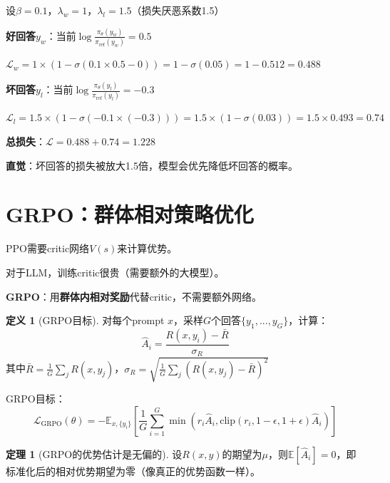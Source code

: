 \documentclass[11pt,a4paper]{article}
\theoremstyle{definition}
\newtheorem{definition}{定义}[section]
\newtheorem{theorem}{定理}[section]
\begin{document}
\begin{calculation}[KTO的数值例子]
设$\beta = 0.1$，$\lambda_w = 1$，$\lambda_l = 1.5$（损失厌恶系数1.5）

\textbf{好回答}$y_w$：当前$\log \frac{\pi_\theta(y_w)}{\pi_{\text{ref}}(y_w)} = 0.5$

$\mathcal{L}_w = 1 \times (1 - \sigma(0.1 \times 0.5 - 0)) = 1 - \sigma(0.05) = 1 - 0.512 = 0.488$

\textbf{坏回答}$y_l$：当前$\log \frac{\pi_\theta(y_l)}{\pi_{\text{ref}}(y_l)} = -0.3$

$\mathcal{L}_l = 1.5 \times (1 - \sigma(-0.1 \times (-0.3))) = 1.5 \times (1 - \sigma(0.03)) = 1.5 \times 0.493 = 0.74$

\textbf{总损失}：$\mathcal{L} = 0.488 + 0.74 = 1.228$

\textbf{直觉}：坏回答的损失被放大1.5倍，模型会优先降低坏回答的概率。
\end{calculation}

\section{GRPO：群体相对策略优化}

\begin{plainwords}[GRPO的动机]
PPO需要critic网络$V(s)$来计算优势。

对于LLM，训练critic很贵（需要额外的大模型）。

\textbf{GRPO}：用\textbf{群体内相对奖励}代替critic，不需要额外网络。
\end{plainwords}

\begin{definition}[GRPO目标]
对每个prompt $x$，采样$G$个回答$\{y_1, ..., y_G\}$，计算：
\[
\hat{A}_i = \frac{R(x, y_i) - \bar{R}}{\sigma_R}
\]
其中$\bar{R} = \frac{1}{G}\sum_j R(x, y_j)$，$\sigma_R = \sqrt{\frac{1}{G}\sum_j (R(x, y_j) - \bar{R})^2}$

GRPO目标：
\[
\mathcal{L}_{\text{GRPO}}(\theta) = -\mathbb{E}_{x, \{y_i\}}\left[\frac{1}{G}\sum_{i=1}^G \min\left(r_i \hat{A}_i, \text{clip}(r_i, 1-\epsilon, 1+\epsilon) \hat{A}_i\right)\right]
\]
\end{definition}

\begin{theorem}[GRPO的优势估计是无偏的]
设$R(x, y)$的期望为$\mu$，则$\mathbb{E}[\hat{A}_i] = 0$，即标准化后的相对优势期望为零（像真正的优势函数一样）。
\end{theorem}
\end{document}
